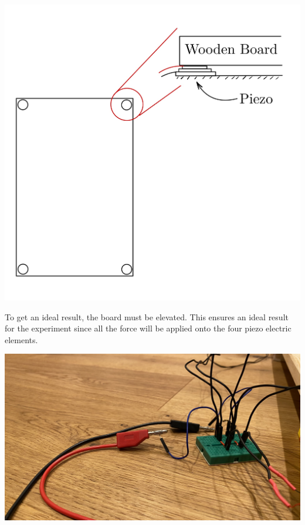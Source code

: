 \begin{minipage}{0.33\textwidth}
    \includegraphics[width=\textwidth]{./Figure_7.jpg}
    \label{fig:Wooden board with piezoelectric elements}
\end{minipage}
\begin{minipage}{0.66\textwidth}
    To get an ideal result, the board must be elevated. This ensures an ideal result for the experiment since all the force will be applied onto the four piezo electric elements.\\
\end{minipage}
\begin{minipage}{0.33\textwidth}
    \includegraphics[width=\textwidth]{./Figure_8.jpg}
    \label{fig:Piezoelectric Elements connected in parallel}
\end{minipage}
